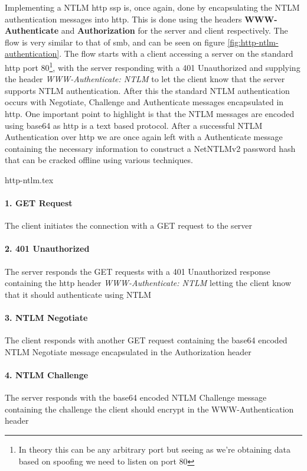 \documentclass{article}
\begin{document}
\subsubsection{}
Implementing a NTLM \gls{http} \gls{ssp} is, once again, done by encapsulating the NTLM authentication messages into \gls{http}. This is done using the headers \textbf{WWW-Authenticate} and \textbf{Authorization} for the server and client respectively. The flow is very similar to that of \gls{smb}, and can be seen on figure \ref{fig:http-ntlm-authentication}. The flow starts with a client accessing a server on the standard \gls{http} port 80\footnote{In theory this can be any arbitrary port but seeing as we're obtaining data based on spoofing we need to listen on port 80}, with the server responding with a 401 Unauthorized and supplying the header \emph{WWW-Authenticate: NTLM} to let the client know that the server supports NTLM authentication. After this the standard NTLM authentication occurs with Negotiate, Challenge and Authenticate messages encapsulated in \gls{http}. One important point to highlight is that the NTLM messages are encoded using base64 as \gls{http} is a text based protocol.
After a successful NTLM Authentication over \gls{http} we are once again left with a Authenticate message containing the necessary information to construct a NetNTLMv2 password hash that can be cracked offline using various techniques.

{http-ntlm.tex}
\paragraph{1. GET Request} The client initiates the connection with a GET request to the server
\paragraph{2. 401 Unauthorized} The server responds the GET requests with a 401 Unauthorized response containing the \gls{http} header \emph{WWW-Authenticate: NTLM} letting the client know that it should authenticate using NTLM
\paragraph{3. NTLM Negotiate} The client responds with another GET request containing the base64 encoded NTLM Negotiate message encapsulated in the Authorization header
\paragraph{4. NTLM Challenge} The server responds with the base64 encoded NTLM Challenge message containing the challenge the client should encrypt in the WWW-Authentication header
\end{document}
